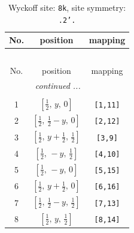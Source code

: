\documentclass[fleqn,8pt]{jsarticle}
\begin{document}
\begin{longtable}{ccc}
\caption{Wyckoff site: {\tt 8k}, site symmetry: {\tt .2'.}}
 \\
 \hline \hline
No. & position & mapping \\ \hline \endfirsthead

\multicolumn{2}{l}{\tablename\ \thetable{}} \\
 \hline \hline
No. & position & mapping \\ \hline \endhead

 \hline \hline
\multicolumn{2}{r}{\footnotesize\it continued ...} \\ \endfoot

 \hline \hline
\multicolumn{2}{r}{} \\ \endlastfoot

1 & $\left[ \frac{1}{2},\, y,\, 0 \right]$ & {\tt [1,11]} \\ \hline
2 & $\left[ \frac{1}{2},\, \frac{1}{2} - y,\, 0 \right]$ & {\tt [2,12]} \\ \hline
3 & $\left[ \frac{1}{2},\, y + \frac{1}{2},\, \frac{1}{2} \right]$ & {\tt [3,9]} \\ \hline
4 & $\left[ \frac{1}{2},\, - y,\, \frac{1}{2} \right]$ & {\tt [4,10]} \\ \hline
5 & $\left[ \frac{1}{2},\, - y,\, 0 \right]$ & {\tt [5,15]} \\ \hline
6 & $\left[ \frac{1}{2},\, y + \frac{1}{2},\, 0 \right]$ & {\tt [6,16]} \\ \hline
7 & $\left[ \frac{1}{2},\, \frac{1}{2} - y,\, \frac{1}{2} \right]$ & {\tt [7,13]} \\ \hline
8 & $\left[ \frac{1}{2},\, y,\, \frac{1}{2} \right]$ & {\tt [8,14]} \\
\end{longtable}
\renewcommand{\arraystretch}{1.2}
\end{document}
